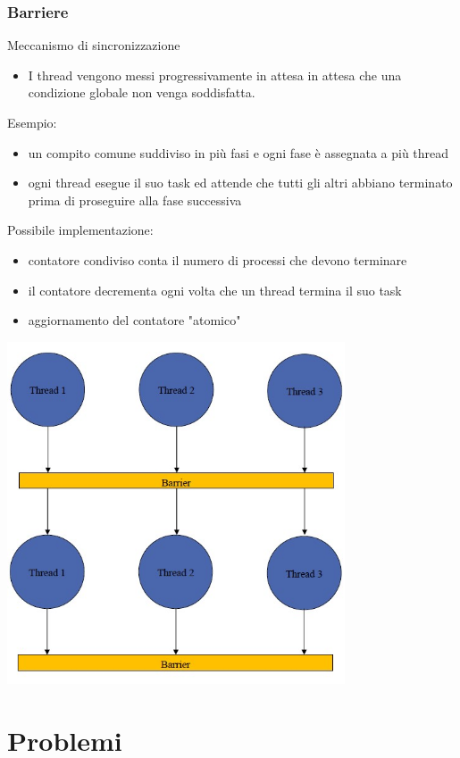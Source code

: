 \subsubsection{Barriere}
Meccanismo di sincronizzazione
\begin{itemize}
    \item I thread vengono messi progressivamente in attesa in attesa che una condizione globale non venga soddisfatta.
\end{itemize}
Esempio:
\begin{itemize}
    \item un compito comune suddiviso in più fasi e ogni fase è assegnata a più thread
    \item ogni thread esegue il suo task ed attende che tutti gli altri abbiano terminato prima di proseguire alla fase successiva
\end{itemize}
Possibile implementazione:
\begin{itemize}
    \item contatore condiviso conta il numero di processi che devono terminare
    \item il contatore decrementa ogni volta che un thread termina il suo task
    \item aggiornamento del contatore "atomico"
\end{itemize}
\begin{center}
    \includegraphics[width=0.75\textwidth]{img/sincronizzazione_barriere1.jpg}
\end{center}

\section{Problemi}
